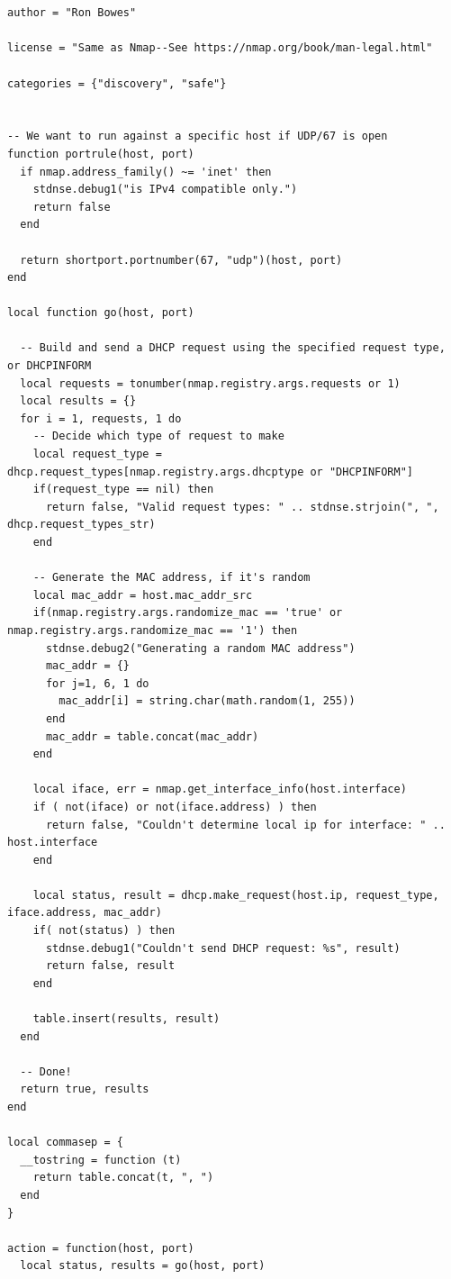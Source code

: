 \documentclass[10pt,a4paper]{report}
\begin{document}
\begin{verbatim}


author = "Ron Bowes"

license = "Same as Nmap--See https://nmap.org/book/man-legal.html"

categories = {"discovery", "safe"}


-- We want to run against a specific host if UDP/67 is open
function portrule(host, port)
  if nmap.address_family() ~= 'inet' then
    stdnse.debug1("is IPv4 compatible only.")
    return false
  end

  return shortport.portnumber(67, "udp")(host, port)
end

local function go(host, port)

  -- Build and send a DHCP request using the specified request type, or DHCPINFORM
  local requests = tonumber(nmap.registry.args.requests or 1)
  local results = {}
  for i = 1, requests, 1 do
    -- Decide which type of request to make
    local request_type = dhcp.request_types[nmap.registry.args.dhcptype or "DHCPINFORM"]
    if(request_type == nil) then
      return false, "Valid request types: " .. stdnse.strjoin(", ", dhcp.request_types_str)
    end

    -- Generate the MAC address, if it's random
    local mac_addr = host.mac_addr_src
    if(nmap.registry.args.randomize_mac == 'true' or nmap.registry.args.randomize_mac == '1') then
      stdnse.debug2("Generating a random MAC address")
      mac_addr = {}
      for j=1, 6, 1 do
        mac_addr[i] = string.char(math.random(1, 255))
      end
      mac_addr = table.concat(mac_addr)
    end

    local iface, err = nmap.get_interface_info(host.interface)
    if ( not(iface) or not(iface.address) ) then
      return false, "Couldn't determine local ip for interface: " .. host.interface
    end

    local status, result = dhcp.make_request(host.ip, request_type, iface.address, mac_addr)
    if( not(status) ) then
      stdnse.debug1("Couldn't send DHCP request: %s", result)
      return false, result
    end

    table.insert(results, result)
  end

  -- Done!
  return true, results
end

local commasep = {
  __tostring = function (t)
    return table.concat(t, ", ")
  end
}

action = function(host, port)
  local status, results = go(host, port)



\end{verbatim}
\end{document}
